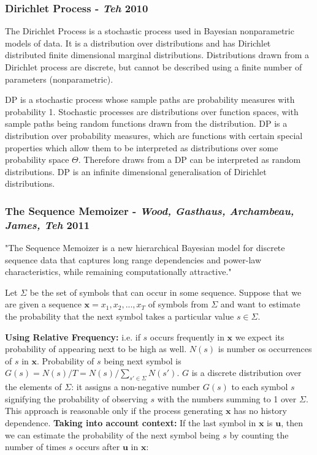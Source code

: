 \subsubsection{Dirichlet Process - \textit{Teh} 2010}

The Dirichlet Process is a stochastic process used in Bayesian nonparametric models of data. It is a distribution over distributions and has Dirichlet distributed finite dimensional marginal distributions. Distributions drawn from a Dirichlet process are discrete, but cannot be described using a finite number of parameters (nonparametric).

DP is a stochastic process whose sample paths are probability measures with probability 1. Stochastic processes are distributions over function spaces, with sample paths being random functions drawn from the distribution. DP is a distribution over probability measures, which are functions with certain special properties which allow them to be interpreted as distributions over some probability space $\Theta$. Therefore draws from a DP can be interpreted as random distributions. DP is an infinite dimensional generalisation of Dirichlet distributions.

\subsubsection{The Sequence Memoizer - \textit{Wood, Gasthaus, Archambeau, James, Teh} 2011}

"The Sequence Memoizer is a new hierarchical Bayesian model for discrete sequence data that captures long range dependencies and power-law characteristics, while remaining computationally attractive."

Let $\Sigma$ be the set of symbols that can occur in some sequence. Suppose that we are given a sequence $\textbf{x}=x_{1}, x_{2}, ..., x_{T}$ of symbols from $\Sigma$ and want to estimate the probability that the next symbol takes a particular value $s \in \Sigma$.

\textbf{Using Relative Frequency:} i.e. if $s$ occurs frequently in $\textbf{x}$ we expect its probability of appearing next to be high as well. $N(s)$ is number os occurrences of $s$ in $\textbf{x}$. Probability of $s$ being next symbol is $G(s)=N(s)/T=N(s)/\sum_{s' \in \Sigma}N(s')$. $G$ is a discrete distribution over the elements of $\Sigma$: it assigns a non-negative number $G(s)$ to each symbol $s$ signifying the probability of observing $s$ with the numbers summing to 1 over $\Sigma$. This approach is reasonable only if the process generating $\textbf{x}$ has no history dependence. 
\textbf{Taking into account context:} If the last symbol in $\textbf{x}$ is $\textbf{u}$, then we can estimate the probability of the next symbol being $s$ by counting the number of times $s$ occurs after $\textbf{u}$ in $\textbf{x}$:

